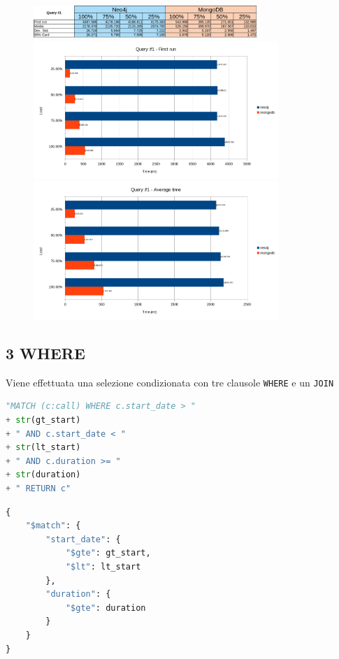     \begin{figure}
        \includegraphics[width=320px, keepaspectratio, center]{query1.png}
        \label{fig:results1}
        \includegraphics[width=350px, keepaspectratio, center]{query1_fr.png}
        \label{fig:query1_fr}
        \includegraphics[width=350px, keepaspectratio, center]{query1_avg.png}
        \label{fig:query1_avg}
    \end{figure}    


\pagebreak
    \subsection{3 WHERE}
    Viene effettuata una selezione condizionata con tre clausole \texttt{WHERE}
    e un \texttt{JOIN}

    \begin{lstlisting}[language=Python, caption=Neo4j]
"MATCH (c:call) WHERE c.start_date > " 
+ str(gt_start) 
+ " AND c.start_date < " 
+ str(lt_start) 
+ " AND c.duration >= " 
+ str(duration) 
+ " RETURN c"

    \end{lstlisting}


    \begin{lstlisting}[language=Python, caption=MongoDB]
{
    "$match": {
        "start_date": {
            "$gte": gt_start,
            "$lt": lt_start
        },
        "duration": {
            "$gte": duration
        }
    }
}
    \end{lstlisting}
    
